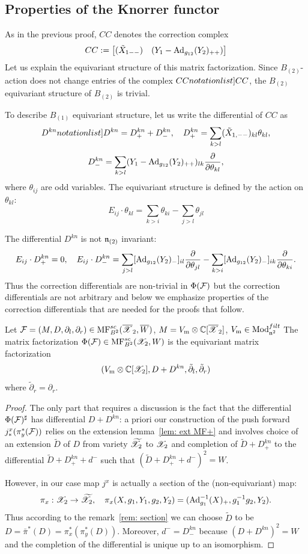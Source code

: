 \subsection{Properties of the Knorrer functor} As in the previous proof, $CC$ denotes the correction complex $$CC:= \begin{bmatrix} (\tilde{X}_{1--} )& (Y_{1}-{\rm Ad}_{g_{12}}(Y_2)_{++})\end{bmatrix}$$
Let us explain the equivariant structure of this matrix factorization. Since $B_{(2)}$-action does not change entries of the complex $\SymbolPrint{CC}$, the $B_{(2)}$ equivariant structure of $B_{(2)}$ is trivial.

To describe $B_{(1)}$ equivariant structure, let us write the differential of $CC$ as
\[ \SymbolPrint{D^{kn}}=D^{kn}_++D^{kn}_-, \quad D^{kn}_+=\sum_{k>l}(\tilde{X}_{1,--})_{kl}\theta_{kl},\]
\[D^{kn}_-=\sum_{k>l}
 (Y_{1}-{\rm Ad}_{g_{12}}(Y_2)_{++})_{lk}
\frac{\partial}{\partial \theta_{kl}},\]
where  $\theta_{ij}$ are odd variables. The equivariant structure is defined by the action on $\theta_{kl}$:
$$ E_{ij}\cdot \theta_{kl}=\sum_{k>i}\theta_{ki}-\sum_{j>l}\theta_{jl}$$

The differential $D^{kn}$ is not $\mathfrak{n}_{(2)}$ invariant:
$$ E_{ij}\cdot D^{kn}_+=0,\quad E_{ij}\cdot D^{kn}_-=\sum_{j>l} [{\rm Ad}_{g_{12}}(Y_2)_-]_{il}\frac{\partial}{\partial\theta_{jl}}-\sum_{k>i} [{\rm Ad}_{g_{12}}(Y_2)_-]_{ik}\frac{\partial}{\partial\theta_{ki}}.$$
Thus the correction differentials are non-trivial in $\Phi(\mathcal{F})$ but the correction differentials are not arbitrary and below we emphasize properties of the correction
differentials that are needed for the proofs that follow.

\def\mltV{V_{\mathrm{m}}}
\begin{proposition} Let $\mathcal{F}=(M,D,\partial_l,\partial_r)\in \mathrm{MF}^{sc}_{B^2}(\overline{\mathscr{X}}_2,\overline{W})$, $M=\mltV\otimes \CC[\calXr_2]$, $\mltV\in \Mod^{filt}_{\frn^2}$
The matrix factorization $\Phi(\mathcal{F})\in \mathrm{MF}^{sc}_{B^2}(\mathscr{X}_2,W)$ is the equivariant matrix factorization
$$ (\mltV\otimes \CC[\calX_2], D+D^{kn}, \tilde{\partial}_l,\tilde{\partial}_r)$$
where $\tilde{\partial}_r=\partial_r$.
\end{proposition}
\begin{proof}
The only part that requires a discussion is the fact that the differential $\Phi(\mathcal{F})^{\sharp}$ has differential $D+D^{kn}$: a priori our construction of the push forward
$j^x_*(\pi_y^*(\mathcal{F}))$ relies on the extension lemma~\ref{lem: ext MF+} and involves choice of an extension $\tilde{D}$ of $D$ from variety $\widetilde{\mathscr{X}}_2$ to $\mathscr{X}_2$
and completion of $\tilde{D}+D^{kn}_+$  to the differential $\tilde{D}+D^{kn}_++d^-$ such that $(\tilde{D}+D^{kn}_++d^-)^2=W$.

However, in our case map $j^x$ is actually a section
of the (non-equivariant) map: $$\pi_x:\mathscr{X}_2\to \widetilde{\mathscr{X}}_2,\quad \pi_x(X,g_1,Y_1,g_2,Y_2)=({\rm Ad}_{g_1}^{-1}(X)_+,g_1^{-1}g_2,Y_2).$$
 Thus according to the remark~\ref{rem: section}
we can choose $\tilde{D}$ to be $D=\bar{\pi}^*(D)=\pi_x^*(\pi_y^*(D))$. Moreover, $d^-=D_-^{kn}$ because $(D+D^{kn})^2=W$ and the completion of  the differential is unique up to an isomorphism.
\end{proof}

